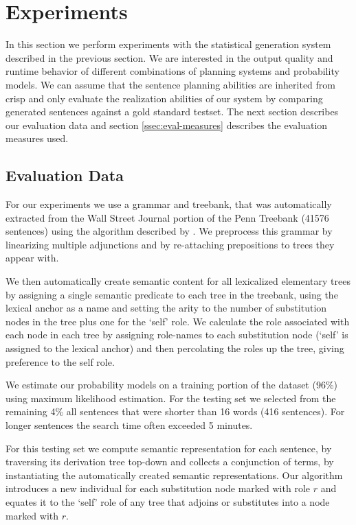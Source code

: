 \section{Experiments}
\label{sec:experiments}
In this section we perform experiments with the statistical generation system described in the previous section.  We are interested in the output quality and runtime behavior of different combinations of planning systems and probability models. We can assume that the sentence planning abilities are inherited from {\sc crisp} and only evaluate the realization abilities of our system by comparing generated sentences against a gold standard testset. The next section describes our evaluation data and section \ref{ssec:eval-measures} describes the evaluation measures used. 

\subsection{Evaluation Data}

For our experiments we use a grammar and treebank, that was automatically extracted from the Wall Street Journal portion of the Penn Treebank (41576 sentences)
using the algorithm described by .  We preprocess this grammar by linearizing multiple adjunctions and by re-attaching prepositions to trees they appear with. 

We then automatically create semantic content for all lexicalized elementary trees by assigning a single semantic predicate to each tree in the treebank, using the lexical anchor as a name and setting the arity to the number of substitution nodes in the tree plus one for the `self' role.  We calculate the role associated with each node in each tree by assigning role-names to each substitution node (`self' is assigned to the lexical anchor) and then percolating the roles up the tree, giving preference to the self role.  

We estimate our probability models on a training portion of the dataset (96\%) using maximum likelihood estimation.
For the testing set we selected from the remaining 4\% all sentences that were shorter than 16 words (416 sentences). For longer sentences the search time often exceeded 5 minutes. 

For this testing set we compute semantic representation for each sentence, by traversing its derivation tree top-down and collects a conjunction of terms, by instantiating the automatically created semantic representations. Our algorithm introduces a new individual for each substitution node marked with role $r$ and equates it to the `self' role of any tree that adjoins or substitutes into a node marked with $r$. 

